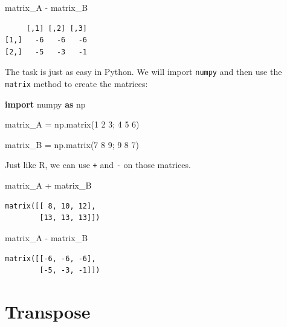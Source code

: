 \documentclass[
  letterpaper,
]{krantz}
\newenvironment{Shaded}{}{}
\newcommand{\ImportTok}[1]{\textcolor[rgb]{0.00,0.50,0.00}{\textbf{#1}}}
\newcommand{\NormalTok}[1]{#1}
\newcommand{\OperatorTok}[1]{\textcolor[rgb]{0.40,0.40,0.40}{#1}}
\newcommand{\SpecialCharTok}[1]{\textcolor[rgb]{0.25,0.44,0.63}{#1}}
\newcommand{\StringTok}[1]{\textcolor[rgb]{0.25,0.44,0.63}{#1}}
\begin{document}
\begin{Shaded}
\begin{Highlighting}[]
\NormalTok{matrix\_A }\SpecialCharTok{{-}}\NormalTok{ matrix\_B}
\end{Highlighting}
\end{Shaded}

\begin{verbatim}
     [,1] [,2] [,3]
[1,]   -6   -6   -6
[2,]   -5   -3   -1
\end{verbatim}

The task is just as easy in Python. We will import \texttt{numpy} and
then use the \texttt{matrix} method to create the matrices:

\begin{Shaded}
\begin{Highlighting}[]
\ImportTok{import}\NormalTok{ numpy }\ImportTok{as}\NormalTok{ np}

\NormalTok{matrix\_A }\OperatorTok{=}\NormalTok{ np.matrix(}\StringTok{\textquotesingle{}1 2 3; 4 5 6\textquotesingle{}}\NormalTok{)}

\NormalTok{matrix\_B }\OperatorTok{=}\NormalTok{ np.matrix(}\StringTok{\textquotesingle{}7 8 9; 9 8 7\textquotesingle{}}\NormalTok{)}
\end{Highlighting}
\end{Shaded}

Just like R, we can use \texttt{+} and \texttt{-} on those matrices.

\begin{Shaded}
\begin{Highlighting}[]
\NormalTok{matrix\_A }\OperatorTok{+}\NormalTok{ matrix\_B}
\end{Highlighting}
\end{Shaded}

\begin{verbatim}
matrix([[ 8, 10, 12],
        [13, 13, 13]])
\end{verbatim}

\begin{Shaded}
\begin{Highlighting}[]
\NormalTok{matrix\_A }\OperatorTok{{-}}\NormalTok{ matrix\_B}
\end{Highlighting}
\end{Shaded}

\begin{verbatim}
matrix([[-6, -6, -6],
        [-5, -3, -1]])
\end{verbatim}

\section{Transpose}\label{transpose}
\end{document}

